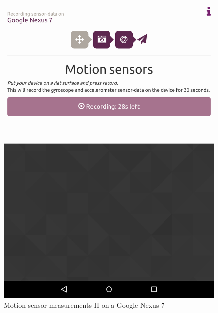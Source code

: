 \begin{figure}[!htb]
\begin{minipage}[c]{.23\textwidth}
    \includegraphics[scale=0.15]{img/sensorrec-nexus-1-rec}
  \end{minipage}
  \caption{Motion sensor measurements II on a Google Nexus 7}
  \label{fig:sensorrec}
\end{figure}

